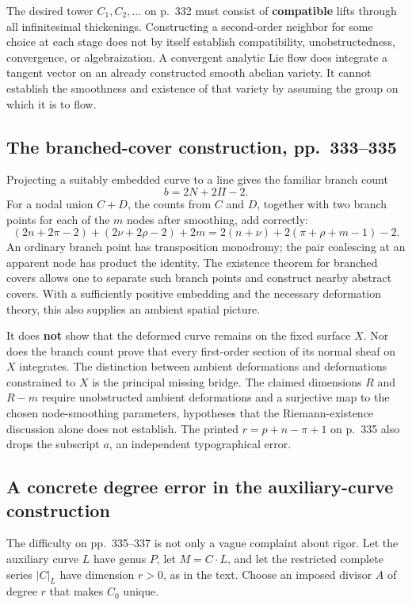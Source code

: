 The desired tower \(C_1,C_2,\ldots\) on p.~332 must consist of \textbf{compatible} lifts through all infinitesimal thickenings. Constructing a second-order neighbor for some choice at each stage does not by itself establish compatibility, unobstructedness, convergence, or algebraization. A convergent analytic Lie flow does integrate a tangent vector on an already constructed smooth abelian variety. It cannot establish the smoothness and existence of that variety by assuming the group on which it is to flow.

\subsection{The branched-cover construction, pp.~333--335}\label{cp2-ix-5-2}

Projecting a suitably embedded curve to a line gives the familiar branch count
\[
b=2N+2\Pi-2.
\]
For a nodal union \(C+D\), the counts from \(C\) and \(D\), together with two branch points for each of the \(m\) nodes after smoothing, add correctly:
\[
(2n+2\pi-2)+(2\nu+2\rho-2)+2m
=2(n+\nu)+2(\pi+\rho+m-1)-2.
\]
An ordinary branch point has transposition monodromy; the pair coalescing at an apparent node has product the identity. The existence theorem for branched covers allows one to separate such branch points and construct nearby abstract covers. With a sufficiently positive embedding and the necessary deformation theory, this also supplies an ambient spatial picture.

It does \textbf{not} show that the deformed curve remains on the fixed surface \(X\). Nor does the branch count prove that every first-order section of its normal sheaf on \(X\) integrates. The distinction between ambient deformations and deformations constrained to \(X\) is the principal missing bridge. The claimed dimensions \(R\) and \(R-m\) require unobstructed ambient deformations and a surjective map to the chosen node-smoothing parameters, hypotheses that the Riemann-existence discussion alone does not establish. The printed \(r=p+n-\pi+1\) on p.~335 also drops the subscript \(a\), an independent typographical error.

\subsection{A concrete degree error in the auxiliary-curve construction}\label{cp2-ix-5-3}

The difficulty on pp.~335--337 is not only a vague complaint about rigor. Let the auxiliary curve \(L\) have genus \(P\), let \(M=C\cdot L\), and let the restricted complete series \(\vert C\vert _L\) have dimension \(r>0\), as in the text. Choose an imposed divisor \(A\) of degree \(r\) that makes \(C_0\) unique.

